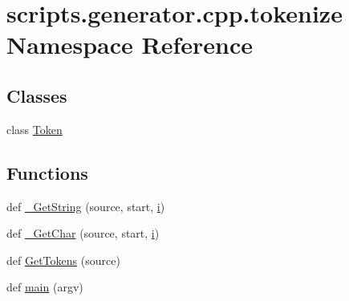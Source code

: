 \hypertarget{namespacescripts_1_1generator_1_1cpp_1_1tokenize}{}\section{scripts.\+generator.\+cpp.\+tokenize Namespace Reference}
\label{namespacescripts_1_1generator_1_1cpp_1_1tokenize}
\subsection*{Classes}
\begin{DoxyCompactItemize}
\item 
class \mbox{\hyperlink{classscripts_1_1generator_1_1cpp_1_1tokenize_1_1_token}{Token}}
\end{DoxyCompactItemize}
\subsection*{Functions}
\begin{DoxyCompactItemize}
\item 
def \mbox{\hyperlink{namespacescripts_1_1generator_1_1cpp_1_1tokenize_a2fdc7cdc1c5bf1b4ac06a620b56da9a0}{\+\_\+\+Get\+String}} (source, start, \mbox{\hyperlink{_obj__test_2lib_2googletest-master_2googlemock_2test_2gmock-matchers__test_8cc_acb559820d9ca11295b4500f179ef6392}{i}})
\item 
def \mbox{\hyperlink{namespacescripts_1_1generator_1_1cpp_1_1tokenize_af68b9aec67dcebb9b919b7ec8a230d78}{\+\_\+\+Get\+Char}} (source, start, \mbox{\hyperlink{_obj__test_2lib_2googletest-master_2googlemock_2test_2gmock-matchers__test_8cc_acb559820d9ca11295b4500f179ef6392}{i}})
\item 
def \mbox{\hyperlink{namespacescripts_1_1generator_1_1cpp_1_1tokenize_a7821a660f6ba51a2b32ea9a3ec82e7f3}{Get\+Tokens}} (source)
\item 
def \mbox{\hyperlink{namespacescripts_1_1generator_1_1cpp_1_1tokenize_a3b3837ce41ee375dd016bb31ef6c052d}{main}} (argv)
\end{DoxyCompactItemize}

